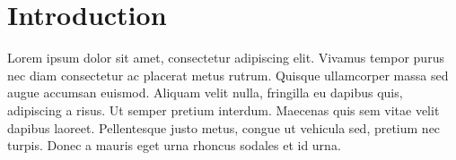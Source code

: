 \chapter{Introduction}

Lorem ipsum dolor sit amet, consectetur adipiscing elit. Vivamus tempor purus nec diam consectetur ac placerat metus rutrum. Quisque ullamcorper massa sed augue accumsan euismod. Aliquam velit nulla, fringilla eu dapibus quis, adipiscing a risus. Ut semper pretium interdum. Maecenas quis sem vitae velit dapibus laoreet. Pellentesque justo metus, congue ut vehicula sed, pretium nec turpis. Donec a mauris eget urna rhoncus sodales et id urna.



